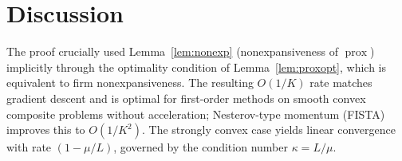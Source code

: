 \documentclass[11pt]{article}
\begin{document}
\section*{Discussion}

The proof crucially used Lemma~\ref{lem:nonexp} (nonexpansiveness of $\operatorname{prox}$) implicitly through the optimality condition of Lemma~\ref{lem:proxopt}, which is equivalent to firm nonexpansiveness. The resulting $O(1/K)$ rate matches gradient descent and is optimal for first-order methods on smooth convex composite problems without acceleration; Nesterov-type momentum (FISTA) improves this to $O(1/K^2)$. The strongly convex case yields linear convergence with rate $(1-\mu/L)$, governed by the condition number $\kappa = L/\mu$.
\end{document}
